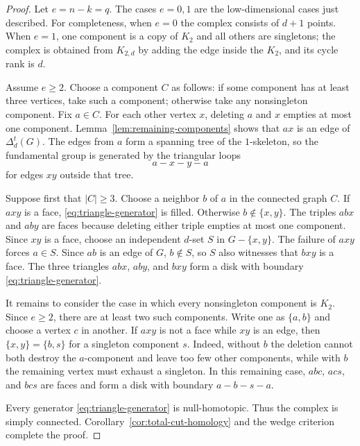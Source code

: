 \documentclass[11pt]{article}
\theoremstyle{remark}
\numberwithin{equation}{section}
\begin{document}
\begin{proof}
Let $e=n-k=q$. The cases $e=0,1$ are the low-dimensional cases just
described. For completeness, when $e=0$ the complex consists of $d+1$ points.
When $e=1$, one component is a copy of $K_2$ and all others are singletons;
the complex is obtained from $K_{2,d}$ by adding the edge inside the $K_2$,
and its cycle rank is $d$.

Assume $e\geq2$. Choose a component $C$ as follows: if some component has at
least three vertices, take such a component; otherwise take any nonsingleton
component. Fix $a\in C$. For each other vertex $x$, deleting $a$ and $x$
empties at most one component. Lemma~\ref{lem:remaining-components} shows that
$ax$ is an edge of $\Delta_d^t(G)$. The edges from $a$ form a spanning tree of
the $1$-skeleton, so the fundamental group is generated by the triangular
loops
\begin{equation}
a-x-y-a
\label{eq:triangle-generator}
\end{equation}
for edges $xy$ outside that tree.

Suppose first that $|C|\geq3$. Choose a neighbor $b$ of $a$ in the connected
graph $C$. If $axy$ is a face, \eqref{eq:triangle-generator} is filled.
Otherwise $b\notin\{x,y\}$. The triples $abx$ and $aby$ are faces because
deleting either triple empties at most one component. Since $xy$ is a face,
choose an independent $d$-set $S$ in $G-\{x,y\}$. The failure of $axy$ forces
$a\in S$. Since $ab$ is an edge of $G$, $b\notin S$, so $S$ also witnesses
that $bxy$ is a face. The three triangles $abx$, $aby$, and $bxy$ form a disk
with boundary \eqref{eq:triangle-generator}.

It remains to consider the case in which every nonsingleton component is
$K_2$. Since $e\geq2$, there are at least two such components. Write one as
$\{a,b\}$ and choose a vertex $c$ in another. If $axy$ is not a face while
$xy$ is an edge, then $\{x,y\}=\{b,s\}$ for a singleton component $s$.
Indeed, without $b$ the deletion cannot both destroy the $a$-component and
leave too few other components, while with $b$ the remaining vertex must
exhaust a singleton. In this remaining case, $abc$, $acs$, and $bcs$ are
faces and form a disk with boundary $a-b-s-a$.

Every generator \eqref{eq:triangle-generator} is null-homotopic. Thus the
complex is simply connected. Corollary~\ref{cor:total-cut-homology} and the
wedge criterion complete the proof.
\end{proof}
\end{document}
